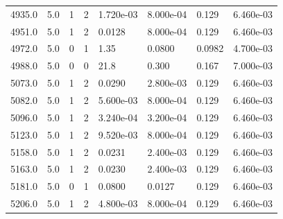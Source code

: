 \documentclass[preview]{standalone}
\begin{document}
{{{{{\begin{tabular}{L{1.2cm}C{1.2cm} C{0.3cm}C{0.5cm} C{1.4cm}C{1.4cm} C{1.4cm}C{1.4cm}}
  4935.0  &   5.0  & 1     &  2 &  1.720e-03  & 8.000e-04  & 0.129 &  6.460e-03   \\ 
  4951.0  &   5.0  & 1     &  2 &  0.0128  & 8.000e-04  & 0.129 &  6.460e-03   \\ 
  4972.0  &   5.0  & 0     &  1 &  1.35  & 0.0800  & 0.0982 &  4.700e-03   \\ 
  4988.0  &   5.0  & 0     &  0 &  21.8  & 0.300  & 0.167 &  7.000e-03   \\ 
  5073.0  &   5.0  & 1     &  2 &  0.0290  & 2.800e-03  & 0.129 &  6.460e-03   \\ 
  5082.0  &   5.0  & 1     &  2 &  5.600e-03  & 8.000e-04  & 0.129 &  6.460e-03   \\ 
  5096.0  &   5.0  & 1     &  2 &  3.240e-04  & 3.200e-04  & 0.129 &  6.460e-03   \\ 
  5123.0  &   5.0  & 1     &  2 &  9.520e-03  & 8.000e-04  & 0.129 &  6.460e-03   \\ 
  5158.0  &   5.0  & 1     &  2 &  0.0231  & 2.400e-03  & 0.129 &  6.460e-03   \\ 
  5163.0  &   5.0  & 1     &  2 &  0.0230  & 2.400e-03  & 0.129 &  6.460e-03   \\ 
  5181.0  &   5.0  & 0     &  1 &  0.0800  & 0.0127  & 0.129 &  6.460e-03   \\ 
  5206.0  &   5.0  & 1     &  2 &  4.800e-03  & 8.000e-04  & 0.129 &  6.460e-03   \\ 
\hline 
\end{tabular} 

}}}}}
\end{document}
